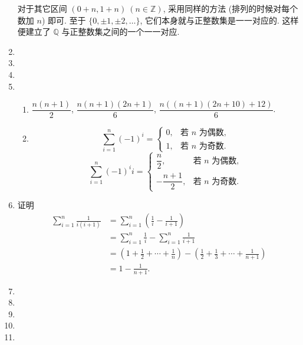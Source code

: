 \documentclass[a4paper, 11pt]{ctexart}
\begin{document}
\begin{enumerate}
            对于其它区间 $(0 + n, 1 + n)\ (n \in \mathbb{Z})$, 采用同样的方法 (排列的时候对每个数加 $n$) 即可. 至于 $\{0, \pm1, \pm2, \dots\}$, 它们本身就与正整数集是一一对应的.
            这样便建立了 $\mathbb{Q}$ 与正整数集之间的一个一一对应.
        \item %
        \item %
        \item %
        \item %
            \begin{enumerate}[(1)]
                \item %
                    $\dfrac{n(n+1)}{2}$, $\dfrac{n(n+1)(2n+1)}{6}$, $\dfrac{n((n+1)(2n+10) + 12)}{6}$.
                \item %
                    \[
                        \sum_{i=1}^n(-1)^i =
                        \begin{cases}
                            0, & \text{若 $n$ 为偶数}, \\
                            1, & \text{若 $n$ 为奇数}.
                        \end{cases}    
                    \]
                    \[
                        \sum_{i=1}^n(-1)^ii =
                        \begin{cases}
                            \dfrac{n}{2}, & \text{若 $n$ 为偶数}, \\
                            -\dfrac{n+1}{2}, & \text{若 $n$ 为奇数}.
                        \end{cases}    
                    \]
            \end{enumerate}
        \item %
            {\heiti 证明}\quad \begin{align*}
                \sum_{i=1}^n\frac{1}{i(i+1)} &= \sum_{i=1}^n\left(\frac1i - \frac{1}{i+1}\right) \\
                                             &= \sum_{i=1}^n\frac1i - \sum_{i=1}^n\frac{1}{i+1} \\
                                             &= \left(1 + \frac12 + \cdots + \frac1n\right) - \left(\frac12 + \frac13 + \cdots + \frac{1}{n+1}\right) \\
                                             &= 1 - \frac{1}{n+1}.
            \end{align*}
        \item %
        \item %
        \item %
        \item %
        \item %
    \end{enumerate}
\end{document}
